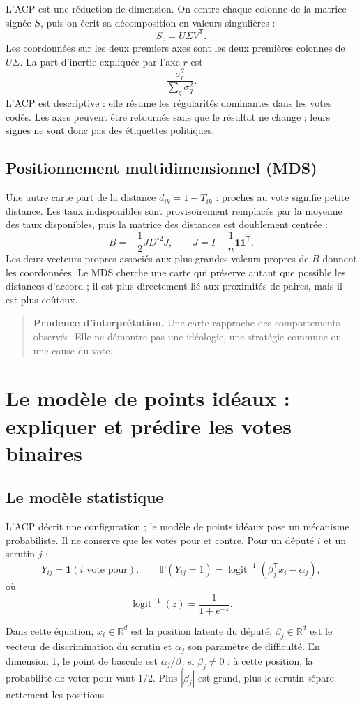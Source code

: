 \documentclass[11pt,a4paper]{article}
\newcommand{\ind}{\mathbf{1}}
\newcommand{\Pp}{\mathbb{P}}
\newcommand{\R}{\mathbb{R}}
\newcommand{\prudence}[1]{\begin{quote}\small\color{red!55!black}\textbf{Prudence d'interprétation.} #1\end{quote}}
\begin{document}
L'ACP est une réduction de dimension. On centre chaque colonne de la matrice
signée $S$, puis on écrit sa décomposition en valeurs singulières :
\[
 S_c=U\Sigma V^{\mathsf T}.
\]
Les coordonnées sur les deux premiers axes sont les deux premières colonnes de
$U\Sigma$. La part d'inertie expliquée par l'axe $r$ est
\[
 \frac{\sigma_r^2}{\sum_q\sigma_q^2}.
\]
L'ACP est descriptive : elle résume les régularités dominantes dans les votes
codés. Les axes peuvent être retournés sans que le résultat ne change ; leurs
signes ne sont donc pas des étiquettes politiques.

\subsection{Positionnement multidimensionnel (MDS)}

Une autre carte part de la distance $d_{ik}=1-T_{ik}$ : proches au vote signifie
petite distance. Les taux indisponibles sont provisoirement remplacés par la
moyenne des taux disponibles, puis la matrice des distances est doublement
centrée :
\[
 B=-\frac12 JD^{\circ2}J,\qquad
 J=I-\frac1n\mathbf{1}\mathbf{1}^{\mathsf T}.
\]
Les deux vecteurs propres associés aux plus grandes valeurs propres de $B$
donnent les coordonnées. Le MDS cherche une carte qui préserve autant que
possible les distances d'accord ; il est plus directement lié aux proximités
de paires, mais il est plus coûteux.

\prudence{Une carte rapproche des comportements observés. Elle ne démontre pas
une idéologie, une stratégie commune ou une cause du vote.}

\section{Le modèle de points idéaux : expliquer et prédire les votes binaires}

\subsection{Le modèle statistique}

L'ACP décrit une configuration ; le modèle de points idéaux pose un mécanisme
probabiliste. Il ne conserve que les votes pour et contre. Pour un député $i$
et un scrutin $j$ :
\[
 Y_{ij}=\ind(\text{$i$ vote pour}),\qquad
 \Pp(Y_{ij}=1)=\operatorname{logit}^{-1}(\beta_j^{\mathsf T}x_i-\alpha_j),
\]
où
\[
 \operatorname{logit}^{-1}(z)=\frac{1}{1+e^{-z}}.
\]

Dans cette équation, $x_i\in\R^d$ est la position latente du député,
$\beta_j\in\R^d$ est le vecteur de discrimination du scrutin et $\alpha_j$
son paramètre de difficulté. En dimension 1, le point de bascule est
$\alpha_j/\beta_j$ si $\beta_j\neq0$ : à cette position, la probabilité de
voter pour vaut $1/2$. Plus $|\beta_j|$ est grand, plus le scrutin sépare
nettement les positions.
\end{document}
